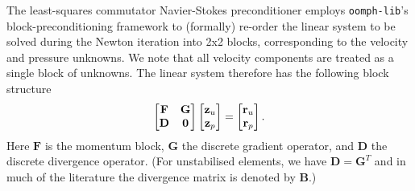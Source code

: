 The least-squares commutator Navier-Stokes preconditioner employs
\texttt{oomph-\allowbreak lib}'s block-preconditioning framework to (formally)
re-order the linear system to be solved during the Newton iteration into 2x2
blocks, corresponding to the velocity and pressure unknowns. We note that all
velocity components are treated as a single block of unknowns. The linear
system therefore has the following block structure
\begin{equation}
\begin{bmatrix}
{\bf F} & {\bf G} \\ {\bf D} & {\bf 0} 
\end{bmatrix}
\begin{bmatrix}
{\bf z}_u \\ {\bf z}_p
\end{bmatrix} 
 =
\begin{bmatrix}
{\bf r}_u \\ {\bf r}_p
\end{bmatrix} 
.
\label{eq:NS_jacobian}
\end{equation}
Here $\mathbf{F}$ is the momentum block, $\mathbf{G}$ the discrete gradient
operator, and $\mathbf{D}$ the discrete divergence operator. (For unstabilised
elements, we have $\mathbf{D} = \mathbf{G}^T$ and in much of the literature the
divergence matrix is denoted by $\mathbf{B}$.)

